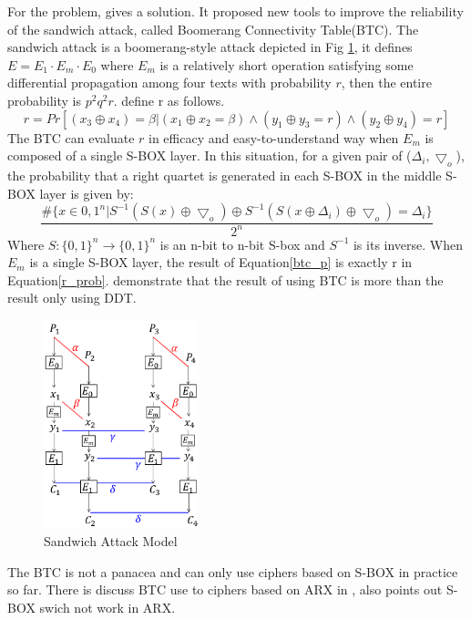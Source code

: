 For the problem, \cite{10.1007/978-3-319-78375-8_22} gives a solution. It proposed new tools to improve the reliability of the sandwich attack, called Boomerang Connectivity Table(BTC). The sandwich attack is a boomerang-style attack depicted in Fig \ref{fig:sandwich}, it defines $E=E_1\cdot E_m\cdot E_0$ where $E_m$ is a relatively short operation satisfying some differential propagation among four texts with probability $r$, then the entire probability is $p^2q^2r$. \cite{dunkelman2010practical} define r as follows.
\begin{equation}
    r=Pr[(x_3\oplus x_4)=\beta|(x_1\oplus x_2=\beta)\wedge (y_1\oplus y_3=r)\wedge(y_2\oplus y_4)=r]
    \label{r_prob}
\end{equation}
The BTC can evaluate $r$ in efficacy and easy-to-understand way when $E_m$ is composed of a single S-BOX layer. In this situation, for a given pair of ($\Delta_i, \bigtriangledown_o$), the probability that a right quartet is generated in each S-BOX in the middle S-BOX layer is given by:
\begin{equation}
\frac{\#\{x\in{0,1}^n|S^{-1}(S(x)\oplus \bigtriangledown_o)\oplus S^{-1}(S(x\oplus \Delta_i)\oplus \bigtriangledown_o)=\Delta_i\}}{2^n}
\label{btc_p}
\end{equation}
Where $S:\{0,1\}^n\to \{0,1\}^n$ is an n-bit to n-bit S-box and $S^{-1}$ is its inverse. When $E_m$ is a single S-BOX layer, the result of Equation\ref{btc_p} is exactly r in Equation\ref{r_prob}. \cite{10.1007/978-3-319-78375-8_22} demonstrate that the result of using BTC is more than the result only using DDT.
\begin{figure}[hbt!]
    \centering
    \includegraphics[width=45mm]{sandwich.png}
    \caption[Boomerang Attack Model]{Sandwich Attack Model}\label{fig:sandwich}
    \end{figure}

The BTC is not a panacea and can only use ciphers based on S-BOX in practice so far. There is discuss BTC use to ciphers based on ARX in \cite{10.1007/978-3-319-78375-8_22}, also points out S-BOX swich not work in ARX.

